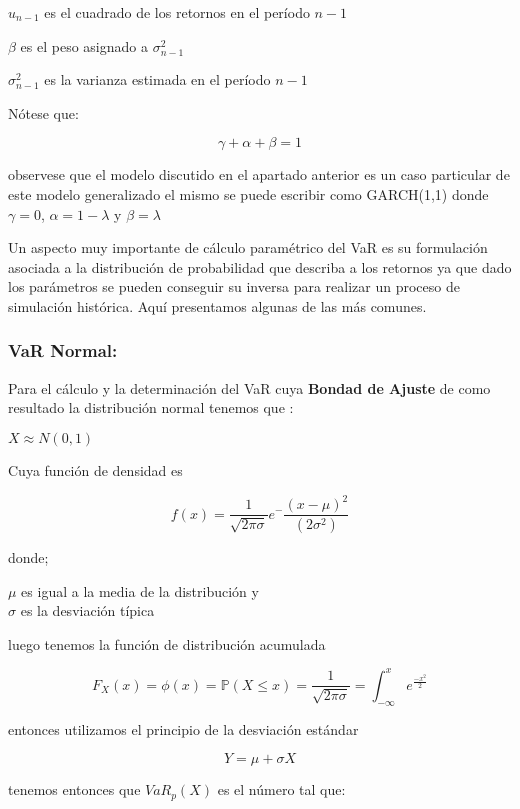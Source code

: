 \documentclass[]{article}
\begin{document}
\(u_{n-1}\) es el cuadrado de los retornos en el período \(n-1\)

\(\beta\) es el peso asignado a \(\sigma_{n-1}^2\)

\(\sigma_{n-1}^2\) es la varianza estimada en el período \(n-1\)

Nótese que:

\[\gamma + \alpha + \beta = 1\]

observese que el modelo discutido en el apartado anterior es un caso
particular de este modelo generalizado el mismo se puede escribir como
GARCH(1,1) donde \(\gamma=0\), \(\alpha= 1 - \lambda\) y
\(\beta = \lambda\)

Un aspecto muy importante de cálculo paramétrico del VaR es su
formulación asociada a la distribución de probabilidad que describa a
los retornos ya que dado los parámetros se pueden conseguir su inversa
para realizar un proceso de simulación histórica. Aquí presentamos
algunas de las más comunes.

\hypertarget{var-normal}{%
\subsubsection{\texorpdfstring{\textbf{VaR
Normal:}}{VaR Normal:}}\label{var-normal}}

Para el cálculo y la determinación del VaR cuya \textbf{Bondad de
Ajuste} de como resultado la distribución normal tenemos que :

\(X \approx N(0,1)\)

Cuya función de densidad es

\[f(x) = \frac{1}{\sqrt{2 \pi \sigma}} e^-\frac{(x - \mu)^2}{(2 \sigma^2)}\]

donde;

\(\mu\) es igual a la media de la distribución y\\
\(\sigma\) es la desviación típica

luego tenemos la función de distribución acumulada

\[F_{X}(x) = \phi(x) = \mathbb{P}(X \leq x) = \frac{1}{\sqrt{2 \pi \sigma}} = \int_{-\infty}^{x}e^{\frac{-x^2}{2}}\]

entonces utilizamos el principio de la desviación estándar

\[Y = \mu + \sigma X\]

tenemos entonces que \(VaR_{p}(X)\) es el número tal que:
\end{document}
